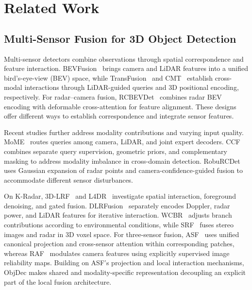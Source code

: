 \section{Related Work}\label{sec:related-work}

\subsection{Multi-Sensor Fusion for 3D Object Detection}
\label{subsec:21}

Multi-sensor detectors combine observations through spatial correspondence and feature interaction. BEVFusion~\citep{liu2023bevfusion} brings camera and LiDAR features into a unified bird's-eye-view (BEV) space, while TransFusion~\citep{bai2022transfusion} and CMT~\citep{yan2023cmt} establish cross-modal interactions through LiDAR-guided queries and 3D positional encoding, respectively. For radar--camera fusion, RCBEVDet~\citep{lin2024rcbevdet} combines radar BEV encoding with deformable cross-attention for feature alignment. These designs offer different ways to establish correspondence and integrate sensor features.

Recent studies further address modality contributions and varying input quality. MoME~\citep{park2025mome} routes queries among camera, LiDAR, and joint expert decoders. CCF~\citep{wu2026ccf} combines separate query supervision, geometric priors, and complementary masking to address modality imbalance in cross-domain detection. RobuRCDet~\citep{yue2025roburcdet} uses Gaussian expansion of radar points and camera-confidence-guided fusion to accommodate different sensor disturbances.

On K-Radar, 3D-LRF~\citep{chae2024threedlrf} and L4DR~\citep{huang2025l4dr} investigate spatial interaction, foreground denoising, and gated fusion. DLRFusion~\citep{chae2025dlrfusion} separately encodes Doppler, radar power, and LiDAR features for iterative interaction. WCBR~\citep{li2026wcbr} adjusts branch contributions according to environmental conditions, while SRF~\citep{mukhatbekov2026srf} fuses stereo images and radar in 3D voxel space. For three-sensor fusion, ASF~\citep{paek2025asf} uses unified canonical projection and cross-sensor attention within corresponding patches, whereas RAF~\citep{park2026raf} modulates camera features using explicitly supervised image reliability maps. Building on ASF's projection and local interaction mechanisms, ObjDec makes shared and modality-specific representation decoupling an explicit part of the local fusion architecture.

